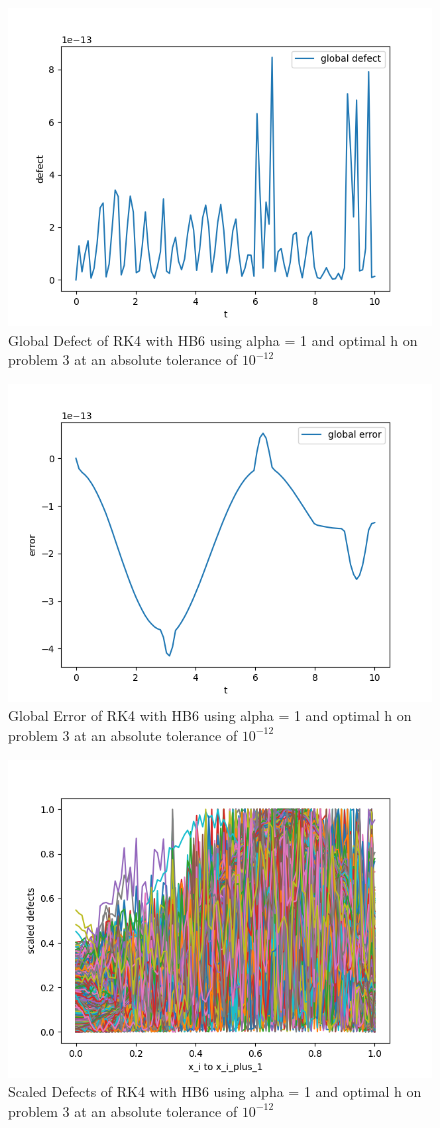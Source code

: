 \documentclass{article}
\begin{document}
\begin{figure}[H]
\centering
\includegraphics[width=0.7\linewidth]{./figures/sharp_tolerance_rk4_with_hb6_p3_global_defect}
\caption{Global Defect of RK4 with HB6 using alpha = 1 and optimal h on problem 3 at an absolute tolerance of $10^{-12}$}
\label{fig:sharp_tolerance_rk4_with_hb6_p3_global_defect}
\end{figure}

\begin{figure}[H]
\centering
\includegraphics[width=0.7\linewidth]{./figures/sharp_tolerance_rk4_with_hb6_p3_global_error}
\caption{Global Error of RK4 with HB6 using alpha = 1 and optimal h on problem 3 at an absolute tolerance of $10^{-12}$}
\label{fig:sharp_tolerance_rk4_with_hb6_p3_global_error}
\end{figure}

\begin{figure}[H]
\centering
\includegraphics[width=0.7\linewidth]{./figures/sharp_tolerance_rk4_with_hb6_p3_scaled_defects}
\caption{Scaled Defects of RK4 with HB6 using alpha = 1 and optimal h on problem 3 at an absolute tolerance of $10^{-12}$}
\label{fig:sharp_tolerance_rk4_with_hb6_p3_scaled_defects}
\end{figure}
\end{document}
